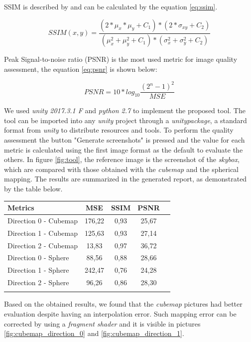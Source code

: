 \documentclass[12pt]{article}
\begin{document}
SSIM is described by \cite{wang2004image} and can be calculated by the equation \ref{eq:ssim}.

\begin{equation}
SSIM(x,y)=\frac{(2*\mu_x*\mu_y+C_1)*(2*\sigma_{xy}+C_2)}{(\mu^2_x+\mu^2_y+C_1)*(\sigma^2_x+\sigma^2_y+C_2)}
\label{eq:ssim}
\end{equation}

Peak Signal-to-noise ratio (PSNR) is the most used metric for image quality assessment, the equation \ref{eq:psnr} is shown below:

\begin{equation}
PSNR = 10*log_{10}{\frac{(2^n-1)^2}{MSE}}
\label{eq:psnr}
\end{equation}

We used \textit{unity 2017.3.1 F} and \textit{python 2.7} to implement the proposed tool. The tool can be imported into any \textit{unity} project through a \textit{unitypackage}, a standard format from \textit{unity} to distribute resources and tools. To perform the quality assessment the button "Generate screenshots" is pressed and the value for each metric is calculated using the first image format as the default to evaluate the others. In figure \ref{fig:tool}, the reference image is the screenshot of the \textit{skybox}, which are compared with those obtained with the \textit{cubemap} and the spherical mapping. The results are summarized in the generated report, as demonstrated by the table below.

\begin{tabular}{l*{3}{c}r}
Metrics               & MSE & SSIM & PSNR \\
\hline
Direction 0 - Cubemap & 176,22 & 0,93 & 25,67 \\
Direction 1 - Cubemap & 125,63 & 0,93 & 27,14 \\
Direction 2 - Cubemap & 13,83 & 0,97 & 36,72 \\
Direction 0 - Sphere  & 88,56 & 0,88 & 28,66 \\
Direction 1 - Sphere  & 242,47 & 0,76 & 24,28 \\
Direction 2 - Sphere  & 96,26 & 0,86 & 28,30 \\
\label{tab:metrics_results}
\end{tabular}

Based on the obtained results, we found that the \textit{cubemap} pictures had better evaluation despite having an interpolation error. Such mapping error can be corrected by using a \textit{fragment shader} and it is visible in pictures \ref{fig:cubemap_direction_0} and \ref{fig:cubemap_direction_1}.
\end{document}
